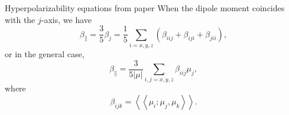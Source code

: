 \documentclass[xetex,compress]{beamer}
\begin{document}
\begin{frame}{Hyperpolarizability equations from paper}
  When the dipole moment coincides with the \(j\)-axis, we have
  \begin{equation}
    \beta_{\parallel} = \frac{3}{5}\beta_j = \frac{1}{5} \sum_{i=x,y,z} (\beta_{iij} + \beta_{iji} + \beta_{jii}),
  \end{equation}
  or in the general case,
  \begin{equation}
    \beta_{\parallel} = \frac{3}{5|\mu|} \sum_{i,j=x,y,z} \beta_{iij} \mu_{j},
  \end{equation}
  where
  \begin{equation}
    \beta_{ijk} = \left<\left<\mu_{i};\mu_{j},\mu_{k}\right>\right>.
  \end{equation}
\end{frame}
\end{document}
